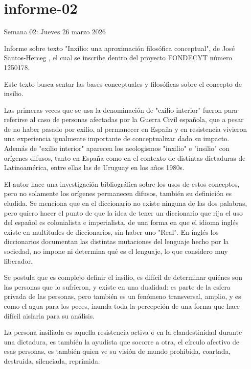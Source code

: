 \documentclass[./informes.tex]{subfiles}
\begin{document}
\chapter{informe-02}

Semana 02: Jueves 26 marzo 2026

Informe sobre texto "Inxilio: una aproximación filosófica conceptual", de José Santos-Herceg \cite{inxilioSantos}, el cual se inscribe dentro del proyecto FONDECYT número 1250178.

Este texto busca sentar las bases conceptuales y filosóficas sobre el concepto de insilio.

Las primeras veces que se usa la denominación de "exilio interior" fueron para referirse al caso de personas afectadas por la Guerra Civil española, que a pesar de no haber pasado por exilio, al permanecer en España y en resistencia vivieron una experiencia igualmente importante de conceptualizar dado su impacto. Además de "exilio interior" aparecen los neologismos "inxilio" e "insilio" con orígenes difusos, tanto en España como en el contexto de distintas dictaduras de Latinoamérica, entre ellas las de Uruguay en los años 1980s.

El autor hace una investigación bibliográfica sobre los usos de estos conceptos, pero no solamente los orígenes permanecen difusos, también su definición es eludida. Se menciona que en el diccionario no existe ninguna de las dos palabras, pero quiero hacer el punto de que la idea de tener un diccionario que rija el uso del español es colonialista e imperialista, de una forma en que el idioma inglés existe en multitudes de diccionarios, sin haber uno "Real". En inglés los diccionarios documentan las distintas mutaciones del lenguaje hecho por la sociedad, no impone ni determina qué es el lenguaje, lo que considero muy liberador.

Se postula que es complejo definir el insilio, es difícil de determinar quiénes son las personas que lo sufrieron, y existe en una dualidad: es parte de la esfera privada de las personas, pero también es un fenómeno transversal, amplio, y es como el agua para los peces, inunda toda la percepción de una forma que hace difícil aislarla para su análisis.

La persona insiliada es aquella resistencia activa o en la clandestinidad durante una dictadura, es también la ayudista que socorre a otra, el círculo afectivo de esas personas, es también quien ve su visión de mundo prohibida, coartada, destruida, silenciada, reprimida.
\end{document}
